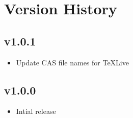 \documentclass{article}
\begin{document}
\section{Version History}

\subsection*{v1.0.1}

\begin{itemize}
    \item Update CAS file names for \TeX{}Live
\end{itemize}

\subsection*{v1.0.0}

\begin{itemize}
    \item Intial release
\end{itemize}
\end{document}
